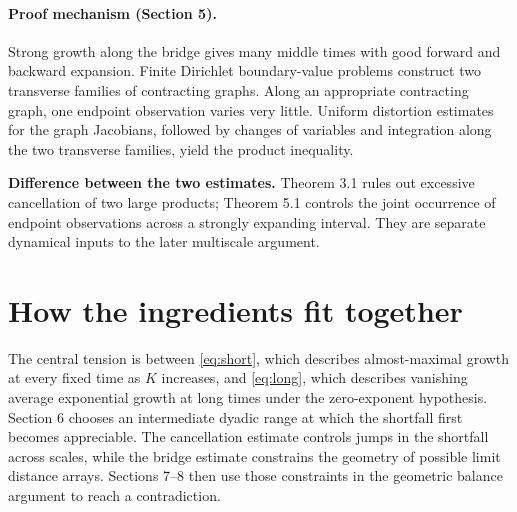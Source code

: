 \documentclass[11pt,a4paper]{article}
\begin{document}
\paragraph{Proof mechanism (Section 5).} Strong growth along the bridge gives many middle times with good forward and backward expansion. Finite Dirichlet boundary-value problems construct two transverse families of contracting graphs. Along an appropriate contracting graph, one endpoint observation varies very little. Uniform distortion estimates for the graph Jacobians, followed by changes of variables and integration along the two transverse families, yield the product inequality.

\medskip
\noindent\textbf{Difference between the two estimates.}
Theorem 3.1 rules out excessive cancellation of two large products; Theorem 5.1 controls the joint occurrence of endpoint observations across a strongly expanding interval. They are separate dynamical inputs to the later multiscale argument.

\section{How the ingredients fit together}

The central tension is between \eqref{eq:short}, which describes almost-maximal growth at every fixed time as $K$ increases, and \eqref{eq:long}, which describes vanishing average exponential growth at long times under the zero-exponent hypothesis. Section 6 chooses an intermediate dyadic range at which the shortfall first becomes appreciable. The cancellation estimate controls jumps in the shortfall across scales, while the bridge estimate constrains the geometry of possible limit distance arrays. Sections 7--8 then use those constraints in the geometric balance argument to reach a contradiction.

\begin{center}
\end{center}
\end{document}
